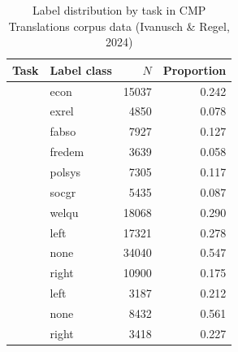 \begin{table}[!t]

\caption{\label{tab:label_distribution_cmp_translations_sample}Label distribution by task in CMP Translations corpus data (Ivanusch \& Regel, 2024)}
\centering
\fontsize{10}{12}\selectfont
\begin{tabular}[t]{>{\raggedright\arraybackslash}L{2.2in}lrr}
\toprule
\headrow Task & Label class & $N$ & Proportion\\
\midrule
 & econ & 15037 & 0.242\\

 & exrel & 4850 & 0.078\\

 & fabso & 7927 & 0.127\\

 & fredem & 3639 & 0.058\\

 & polsys & 7305 & 0.117\\

 & socgr & 5435 & 0.087\\

 & welqu & 18068 & 0.290\\
 & left & 17321 & 0.278\\

 & none & 34040 & 0.547\\

 & right & 10900 & 0.175\\
 & left & 3187 & 0.212\\

 & none & 8432 & 0.561\\

 & right & 3418 & 0.227\\
\bottomrule
\end{tabular}
\end{table}
